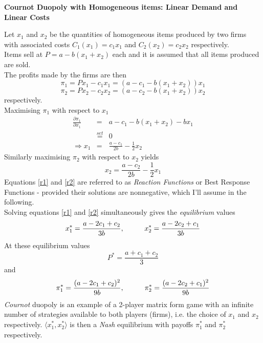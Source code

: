 \documentclass[12pt]{article}
\begin{document}
\begin{center}
\textbf{Cournot Duopoly with Homogeneous items: Linear Demand and Linear Costs %
}
\end{center}
Let $x_1$ and $x_2$ be the quantities of homogeneous items produced by two firms with associated costs $C_1(x_1) = c_1x_1$ and $C_2(x_2)= c_2x_2$ respectively.\\
Items sell at $P = a - b(x_1+x_2)$ each and it is assumed that all items produced are sold. \\ The profits made by the firms are then
$$ \pi_1 = P x_1 - c_1 x_1 = \left(a-c_1 - b(x_1+x_2)\right)x_1$$
$$ \pi_2 = P x_2 - c_2 x_2 = \left(a-c_2 - b(x_1+x_2)\right)x_2$$
respectively.\\
Maximising $\pi_1$ with respect to $x_1$
\begin{eqnarray}
 \frac{\partial \pi_1} {\partial x_1} &=& a-c_1 - b(x_1+x_2) - bx_1 \nonumber \\
 & \stackrel{set}{=} & 0 \nonumber \\
 \Rightarrow x_1 &=& \frac{a-c_1}{2b} - \frac{1}{2} x_2 \label{r1}
 \end{eqnarray}
 Similarly maximising $\pi_2$ with respect to $x_2$ yields
 \begin{equation} x_2 = \frac{a-c_2}{2b} - \frac{1}{2} x_1 \label{r2} \end{equation}
 Equations \ref{r1} and \ref{r2} are referred to as \textit{Reaction Functions} or Best Response Functions -  provided their solutions are nonnegative, which I'll assume in the following.\\
 Solving equations \ref{r1} and \ref{r2} simultaneously gives the \textit{equilibrium} values
 $$ x_1^* = \frac{a - 2c_1 + c_2}{3b}, \hspace{10mm} x_2^* = \frac{a - 2c_2 + c_1}{3b} $$
 At these equilibrium values
 $$ P^* = \frac{a+c_1+c_2}{3} $$
 and
 \begin{equation} \pi_1^* = \frac{(a-2c_1+ c_2)^2}{9b}, \hspace{10mm} \pi_2^* = \frac{(a-2c_2+ c_1)^2}{9b}\label{cp} \end{equation}
 \textit{Cournot} duopoly is an example of a 2-player matrix form game with an infinite number of strategies available to both players (firms), i.e. the choice of $x_1$ and $x_2$ respectively. $\langle x_1^*, x_2^* \rangle $ is then a \textit{Nash} equilibrium with payoffs $ \pi_1^*$ and $\pi_2^*$ respectively.\\
\end{document}
